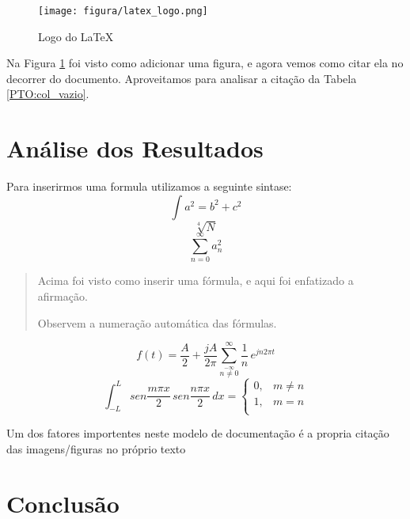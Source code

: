 \documentclass[a4paper, 12pt]{article}
\begin{document}
\begin{figure}[!h]
\centering
\texttt{[image: figura/latex\_logo.png]}
\caption{Logo do LaTeX} \cite{lamport1994latex} %
\label{fig:Logo_latex}
\end{figure}

Na Figura \ref{fig:Logo_latex} foi visto como adicionar uma figura, e agora vemos como citar ela no decorrer do documento. Aproveitamos para analisar a citação da Tabela \ref{PTO:col_vazio}.

\section{Análise dos Resultados}

Para inserirmos uma formula utilizamos a seguinte sintase:
\begin{equation}
\int a^{2}=b^{2}+c^{2}
\label{EQ:pitagoras}
\end{equation}
\begin{equation}
\sqrt[4]{N}
\end{equation}
\begin{equation}
\sum_{n=0}^{\infty} a_{n}^{2}
\end{equation}

\begin{quote}
Acima foi visto como inserir uma fórmula, e aqui foi enfatizado a afirmação.\par Observem a numeração automática das fórmulas.
\end{quote}

\begin{equation}
f(t)= \frac{A}{2} + \frac{jA}{2 \pi }
\sum_{\stackrel{-\infty}{n
\neq 0}}^{\infty} \frac{1}{n} \, e^{jn2\pi t}
\end{equation}
\begin{equation}
\int_{-L}^{L} sen \frac{m \pi x}{2}\,sen \frac{n \pi x}{2}\,dx =
\left \{
\begin{array}{cc}
0, & m \neq n \\
1, & m = n \\
\end{array}
\right.
\end{equation}

Um dos fatores importentes neste modelo de documentação é a propria citação das imagens/figuras no próprio texto

\section{Conclusão}
\end{document}
